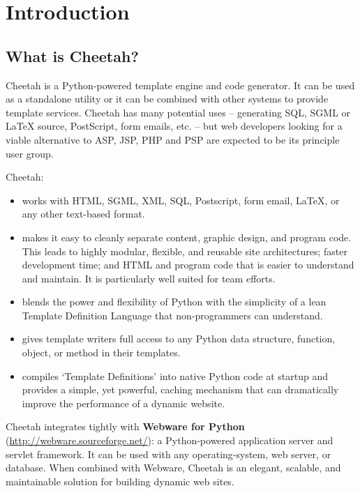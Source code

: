 \section{Introduction}
\label{intro}

\subsection{What is Cheetah?}
\label{intro.whatIs}

Cheetah is a Python-powered template engine and code generator.  It can be used
as a standalone utility or it can be combined with other systems to provide
template services.  Cheetah has many potential uses -- generating SQL, SGML or
LaTeX source, PostScript, form emails, etc. -- but web developers looking for a
viable alternative to ASP, JSP, PHP and PSP are expected to be its principle
user group.

Cheetah:
\begin{itemize}        
\item works with HTML, SGML, XML, SQL, Postscript, form email, LaTeX, or any
     other text-based format.
     
\item makes it easy to cleanly separate content, graphic design, and program
     code.  This leads to highly modular, flexible, and reusable site
     architectures; faster development time; and HTML and program code that is
     easier to understand and maintain. It is particularly well suited for team
     efforts.
     
\item blends the power and flexibility of Python with the simplicity of a lean
     Template Definition Language that non-programmers can understand.  
     
\item gives template writers full access to any Python data structure,
     function, object, or method in their templates.
     
\item compiles `Template Definitions' into native Python code at startup and
     provides a simple, yet powerful, caching mechanism that can dramatically
     improve the performance of a dynamic website.

\end{itemize}   

Cheetah integrates tightly with {\bf Webware for Python}
(\url{http://webware.sourceforge.net/}): a Python-powered application server and
servlet framework. It can be used with any operating-system, web server, or
database. When combined with Webware, Cheetah is an elegant, scalable, and
maintainable solution for building dynamic web sites.

